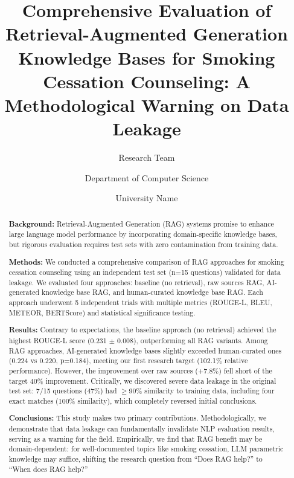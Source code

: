 \documentclass[10pt,letterpaper]{article}
\begin{document}
\title{Comprehensive Evaluation of Retrieval-Augmented Generation Knowledge Bases for Smoking Cessation Counseling: A Methodological Warning on Data Leakage}

\author[1]{Research Team\\}
\author[1]{Department of Computer Science\\}
\author[1]{University Name\\}

\begin{abstract}
\textbf{Background:} Retrieval-Augmented Generation (RAG) systems promise to enhance large language model performance by incorporating domain-specific knowledge bases, but rigorous evaluation requires test sets with zero contamination from training data.

\textbf{Methods:} We conducted a comprehensive comparison of RAG approaches for smoking cessation counseling using an independent test set (n=15 questions) validated for data leakage. We evaluated four approaches: baseline (no retrieval), raw sources RAG, AI-generated knowledge base RAG, and human-curated knowledge base RAG. Each approach underwent 5 independent trials with multiple metrics (ROUGE-L, BLEU, METEOR, BERTScore) and statistical significance testing.

\textbf{Results:} Contrary to expectations, the baseline approach (no retrieval) achieved the highest ROUGE-L score (0.231 $\pm$ 0.008), outperforming all RAG variants. Among RAG approaches, AI-generated knowledge bases slightly exceeded human-curated ones (0.224 vs 0.220, p=0.184), meeting our first research target (102.1\% relative performance). However, the improvement over raw sources (+7.8\%) fell short of the target 40\% improvement. Critically, we discovered severe data leakage in the original test set: 7/15 questions (47\%) had $\geq$90\% similarity to training data, including four exact matches (100\% similarity), which completely reversed initial conclusions.

\textbf{Conclusions:} This study makes two primary contributions. Methodologically, we demonstrate that data leakage can fundamentally invalidate NLP evaluation results, serving as a warning for the field. Empirically, we find that RAG benefit may be domain-dependent: for well-documented topics like smoking cessation, LLM parametric knowledge may suffice, shifting the research question from ``Does RAG help?'' to ``When does RAG help?''
\end{abstract}
\end{document}
